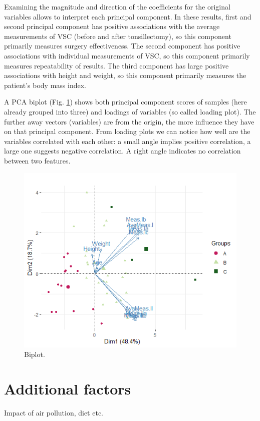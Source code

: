 \documentclass[12pt,a4paper,notitlepage]{report}
\begin{document}
Examining the magnitude and direction of the coefficients for the original variables allows to interpret each principal component. In these results, first and second principal component has positive associations with the average measurements of VSC (before and after tonsillectomy), so this component primarily measures surgery effectiveness. The second component has positive associations with individual measurements of VSC, so this component primarily measures repeatability of results. The third component has large positive associations with height and weight, so this component primarily measures the patient's body mass index. 

A PCA biplot (Fig. \ref{Fig_3.4}) shows both principal component scores of samples (here already grouped into three) and loadings of variables (so called loading plot). The further away vectors (variables) are from the origin, the more influence they have on that principal component.  From loading plots we can notice how well are the variables correlated with each other: a small angle implies positive correlation, a large one suggests negative correlation. A right angle indicates no correlation between two features.

\begin{figure}[h]
	\includegraphics{./Figures/Fig_3.4}
	\caption{Biplot.}
	\label{Fig_3.4}
\end{figure}	




\section{Additional factors}
Impact of air pollution, diet etc.
\end{document}

